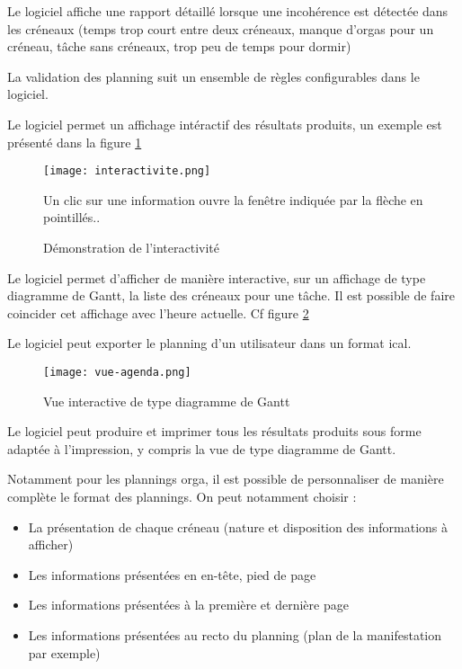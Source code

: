 Le logiciel affiche une rapport détaillé lorsque une incohérence est détectée dans les créneaux (temps trop court entre deux créneaux, manque d'orgas pour un créneau, tâche sans créneaux, trop peu de temps pour dormir)

La validation des planning suit un ensemble de règles configurables dans le logiciel.

Le logiciel permet un affichage intéractif des résultats produits, un exemple est présenté dans la figure \ref{fig:interactivite}

\begin{figure}[h!t]
\centering
\texttt{[image: interactivite.png]}

Un clic sur une information ouvre la fenêtre indiquée par la flèche en pointillés..
\caption{Démonstration de l'interactivité}
\label{fig:interactivite}
\end{figure}


Le logiciel permet d'afficher de manière interactive, sur un affichage de type diagramme de Gantt, la liste des créneaux pour une tâche. Il est possible de faire coincider cet affichage avec l'heure actuelle.
Cf figure \ref{fig:agenda}

Le logiciel peut exporter le planning d'un utilisateur dans un format ical.

\begin{figure}[h!t]
\centering
\texttt{[image: vue-agenda.png]}

\caption{Vue interactive de type diagramme de Gantt}
\label{fig:agenda}
\end{figure}


Le logiciel peut produire et imprimer tous les résultats produits sous forme adaptée à l'impression, y compris la vue de type diagramme de Gantt.


Notamment pour les plannings orga, il est possible de personnaliser de manière complète le format des plannings. On peut notamment choisir :
\begin{itemize}
 \item La présentation de chaque créneau (nature et disposition des informations à afficher)
\item Les informations présentées en en-tête, pied de page
\item Les informations présentées à la première et dernière page
\item Les informations présentées au recto du planning (plan de la manifestation par exemple)
\end{itemize}

